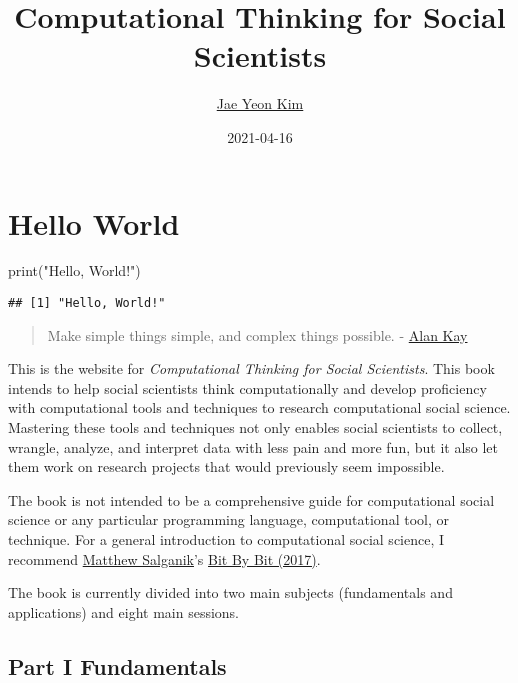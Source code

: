 \documentclass[
]{book}
\title{Computational Thinking for Social Scientists}
\author{\href{https://jaeyk.github.io/}{Jae Yeon Kim}}
\date{2021-04-16}
\newenvironment{Shaded}{\begin{snugshade}}{\end{snugshade}}
\newcommand{\FunctionTok}[1]{\textcolor[rgb]{0.00,0.00,0.00}{#1}}
\newcommand{\NormalTok}[1]{#1}
\newcommand{\StringTok}[1]{\textcolor[rgb]{0.31,0.60,0.02}{#1}}
\begin{document}
\maketitle

{
\hypersetup{linkcolor=}
\setcounter{tocdepth}{1}
\tableofcontents
}
\hypertarget{hello-world}{%
\chapter{Hello World}\label{hello-world}}

\begin{Shaded}
\begin{Highlighting}[]
\FunctionTok{print}\NormalTok{(}\StringTok{"Hello, World!"}\NormalTok{)}
\end{Highlighting}
\end{Shaded}

\begin{verbatim}
## [1] "Hello, World!"
\end{verbatim}

\begin{quote}
Make simple things simple, and complex things possible. - \href{https://www.quora.com/What-is-the-story-behind-Alan-Kay-s-adage-Simple-things-should-be-simple-complex-things-should-be-possible}{Alan Kay}
\end{quote}

This is the website for \emph{Computational Thinking for Social Scientists}. This book intends to help social scientists think computationally and develop proficiency with computational tools and techniques to research computational social science. Mastering these tools and techniques not only enables social scientists to collect, wrangle, analyze, and interpret data with less pain and more fun, but it also let them work on research projects that would previously seem impossible.

The book is not intended to be a comprehensive guide for computational social science or any particular programming language, computational tool, or technique. For a general introduction to computational social science, I recommend \href{http://www.princeton.edu/~mjs3/}{Matthew Salganik}'s \href{https://www.bitbybitbook.com/}{Bit By Bit (2017)}.

The book is currently divided into two main subjects (fundamentals and applications) and eight main sessions.

\hypertarget{part-i-fundamentals}{%
\section{Part I Fundamentals}\label{part-i-fundamentals}}
\end{document}
